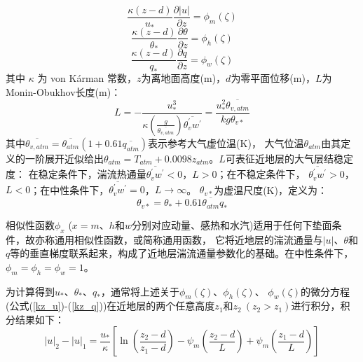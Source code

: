 \begin{equation}\label{kz_u}
\frac{\kappa (z-d)}{u_{*}} \frac{\partial|u|}{\partial z}=\phi_{m}(\zeta)
\end{equation}
\begin{equation}\label{kz_theta}
\frac{\kappa (z-d)}{\theta_{*}} \frac{\partial \theta}{\partial z}=\phi_{h}(\zeta)
\end{equation}
\begin{equation}\label{kz_q}
\frac{\kappa (z-d)}{q_{*}} \frac{\partial q}{\partial z}=\phi_{w}(\zeta)
\end{equation}
其中 $\kappa$ 为 von K\'arman 常数，$z$为离地面高度(m)，$d$为零平面位移(m)，$L$为Monin-Obukhov长度(m)：
\begin{equation}\label{ObukL}
L=-\frac{u_{*}^{3}}{\kappa \left(\frac{g}{\overline{\theta_{v, atm}}}\right) \overline{\theta_{v}^{\prime} w^{\prime}}}=\frac{u_{*}^{2} \overline{\theta_{v, atm}}}{k g \theta_{v *}}
\end{equation}
其中$\overline{\theta_{v,atm}}=\overline{\theta_{atm}}(1+0.61\overline{q_{atm}})$表示参考大气虚位温(K)，
 大气位温$\theta_{atm}$由其定义的一阶展开近似给出$\theta_{atm}=T_{atm}+0.0098z_{atm}$。$L$可表征近地层的大气层结稳定度：
 在稳定条件下，湍流热通量$\overline{\theta_v^\prime w^\prime}<0$，$L>0$；在不稳定条件下，
 $\overline{\theta_v^\prime w^\prime}>0$，$L<0$；在中性条件下，$\overline{\theta_v^\prime w^\prime}=0$，$L\rightarrow\infty$。
$\theta_{v\ast}$为虚温尺度(K)，定义为：
\begin{equation}\label{thvstar}
\theta_{v\ast}=\theta_\ast+0.61\overline{\theta_{atm}}q_\ast
\end{equation}

相似性函数$\phi_x$ ($x=m$、$h$和$w$分别对应动量、感热和水汽)适用于任何下垫面条件，故亦称通用相似性函数，或简称通用函数，
它将近地层的湍流通量与$\left|u\right|$、$\theta$和$q$等的垂直梯度联系起来，构成了近地层湍流通量参数化的基础。在中性条件下，$\phi_m=\phi_h=\phi_w=1$。



为计算得到$u_\ast$、$\theta_\ast$、$q_\ast$，通常将上述关于$\phi_m\left(\zeta\right)$、$\phi_h\left(\zeta\right)$、
$\phi_w(\zeta)$的微分方程(公式(\ref{kz_u})-(\ref{kz_q}))在近地层的两个任意高度$z_1$和$z_2\ (z_2>z_1)$进行积分，积分结果如下：
\begin{equation}
|u|_{2}-|u|_{1}=\frac{u_{*}}{\kappa}\left[\ln \left(\frac{z_{2}-d}{z_{1}-d}\right)-\psi_{m}\left(\frac{z_{2}-d}{L}\right)+\psi_{m}\left(\frac{z_{1}-d}{L}\right)\right]
\end{equation}

